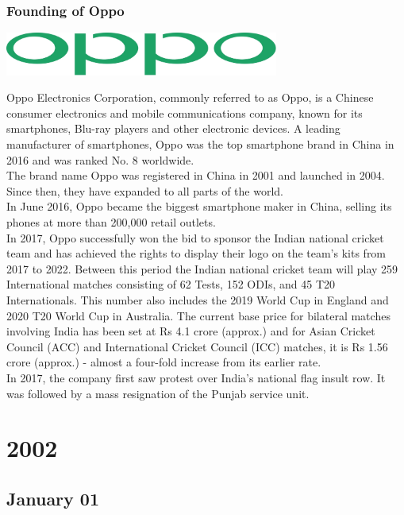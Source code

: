 \documentclass[11pt]{report}
\begin{document}
\subsection{Founding of Oppo}
\vspace{2mm}\begin{center}\includegraphics[width=9cm]{./img/oppoLogo.jpg}\end{center}
Oppo Electronics Corporation, commonly referred to as Oppo, is a Chinese consumer electronics and mobile communications company, known for its smartphones, Blu-ray players and other electronic devices. A leading manufacturer of smartphones, Oppo was the top smartphone brand in China in 2016 and was ranked No. 8 worldwide.\\
\indent The brand name Oppo was registered in China in 2001 and launched in 2004. Since then, they have expanded to all parts of the world.\\ \indent In June 2016, Oppo became the biggest smartphone maker in China, selling its phones at more than 200,000 retail outlets.\\
\indent In 2017, Oppo successfully won the bid to sponsor the Indian national cricket team and has achieved the rights to display their logo on the team’s kits from 2017 to 2022. Between this period the Indian national cricket team will play 259 International matches consisting of 62 Tests, 152 ODIs, and 45 T20 Internationals. This number also includes the 2019 World Cup in England and 2020 T20 World Cup in Australia. The current base price for bilateral matches involving India has been set at Rs 4.1 crore (approx.) and for Asian Cricket Council (ACC) and International Cricket Council (ICC) matches, it is Rs 1.56 crore (approx.) - almost a four-fold increase from its earlier rate.\\
\indent In 2017, the company first saw protest over India's national flag insult row. It was followed by a mass resignation of the Punjab service unit.

\chapter{2002}
\section{January 01}
\end{document}
